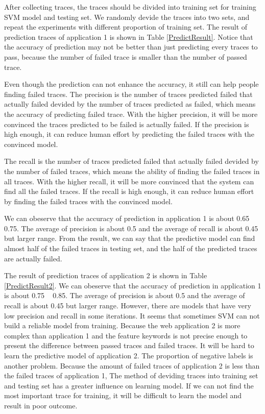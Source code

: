 After collecting traces, the traces should be divided into training set for training SVM model and testing set.
We randomly devide the traces into two sets,
and repeat the experiments with different proportion of training set.
The result of prediction traces of application 1 is shown in Table \ref{PredictResult}.
Notice that the accuracy of prediction may not be better than just predicting every traces to pass,
because the number of failed trace is smaller than the number of passed trace.

Even though the prediction can not enhance the accuracy,
it still can help people finding failed traces.
The precision is the number of traces predicted failed that actually failed devided by the number of traces predicted as failed, 
which means the accuracy of predicting failed trace.
With the higher precision, it will be more convinced the traces predicted to be failed is actually failed.
If the precision is high enough, it can reduce human effort by predicting the failed traces with the convinced model.

The recall is the number of traces predicted failed that actually failed devided by the number of failed traces,
which means the ability of finding the failed traces in all traces.
With the higher recall, it will be more convinced that the system can find all the failed traces.
If the recall is high enough, it can reduce human effort by finding the failed traces with the convinced model.

We can obeserve that the accuracy of prediction in application 1 is about 0.65 ~ 0.75.
The average of precision is about 0.5 and the average of recall is about 0.45 but larger range.
From the result, we can say that the predictive model can find almost half of the failed traces in testing set,
and the half of the predicted traces are actually failed.

The result of prediction traces of application 2 is shown in Table \ref{PredictResult2}.
We can obeserve that the accuracy of prediction in application 1 is about 0.75 ~ 0.85.
The average of precision is about 0.5 and the average of recall is about 0.45 but larger range.
However, there are models that have very low precision and recall in some iterations.
It seems that sometimes SVM can not build a reliable model from training.
Because the web application 2 is more complex than application 1 
and the feature keywords is not precise enough to present the difference between passed traces and failed traces.
It will be hard to learn the predictive model of application 2.
The proportion of negative labels is another problem.
Because the amount of failed traces of application 2 is less than the failed traces of application 1,
The method of deviding traces into training set and testing set has a greater influence on learning model.
If we can not find the most important trace for training,
it will be difficult to learn the model and result in poor outcome.

